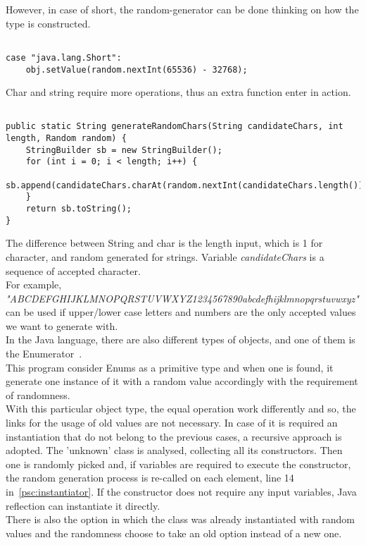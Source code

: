 However, in case of short, the random-generator can be done thinking on how the type is constructed.
\begin{lstlisting}[caption={Random short generator},label={lst:genShort}]% Start your code-block
	
case "java.lang.Short":
	obj.setValue(random.nextInt(65536) - 32768);
\end{lstlisting}
Char and string require more operations, thus an extra function enter in action.
\begin{lstlisting}[caption={Random String/char generator},label={lst:genString&Char}]% Start your code-block

public static String generateRandomChars(String candidateChars, int length, Random random) {
	StringBuilder sb = new StringBuilder();
	for (int i = 0; i < length; i++) {
		sb.append(candidateChars.charAt(random.nextInt(candidateChars.length())));
	}
	return sb.toString();
}
\end{lstlisting}
The difference between String and char is the length input, which is 1 for character, and random generated for strings.
Variable \emph{candidateChars} is a sequence of accepted character. \\
For example, \emph{"ABCDEFGHIJKLMNOPQRSTUVWXYZ1234567890abcdefhijklmnopqrstuvwxyz"} can be used if upper/lower case letters and numbers are the only accepted values we want to generate with.\\
In the Java language, there are also different types of objects, and one of them is the Enumerator~\cite{enum}.\\
This program consider Enums as a primitive type and when one is found, it generate one instance of it with a random value accordingly with the requirement of randomness.\\
With this particular object type, the equal operation work differently and so, the links for the usage of old values are not necessary. 
In case of it is required an instantiation that do not belong to the previous cases, a recursive approach is adopted.
The 'unknown' class is analysed, collecting all its constructors.
Then one is randomly picked and, if variables are required to execute the constructor, the random generation process is re-called on each element, line 14 in~\ref{psc:instantiator}.
If the constructor does not require any input variables, Java reflection can instantiate it directly.\\
There is also the option in which the class was already instantiated with random values and the randomness choose to take an old option instead of a new one.
